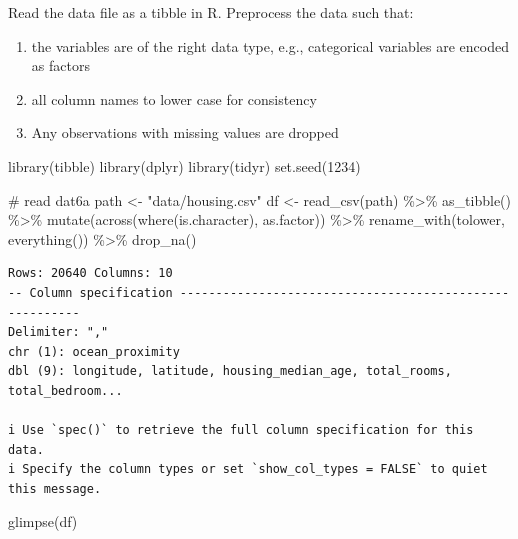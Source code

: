 \documentclass[
  letterpaper,
  DIV=11,
  numbers=noendperiod]{scrartcl}
\newenvironment{Shaded}{\begin{snugshade}}{\end{snugshade}}
\newcommand{\CommentTok}[1]{\textcolor[rgb]{0.37,0.37,0.37}{#1}}
\newcommand{\DecValTok}[1]{\textcolor[rgb]{0.68,0.00,0.00}{#1}}
\newcommand{\FunctionTok}[1]{\textcolor[rgb]{0.28,0.35,0.67}{#1}}
\newcommand{\NormalTok}[1]{\textcolor[rgb]{0.00,0.23,0.31}{#1}}
\newcommand{\OtherTok}[1]{\textcolor[rgb]{0.00,0.23,0.31}{#1}}
\newcommand{\SpecialCharTok}[1]{\textcolor[rgb]{0.37,0.37,0.37}{#1}}
\newcommand{\StringTok}[1]{\textcolor[rgb]{0.13,0.47,0.30}{#1}}
\providecommand{\tightlist}{%
  \setlength{\itemsep}{0pt}\setlength{\parskip}{0pt}}\usepackage{longtable,booktabs,array}
\begin{document}
Read the data file as a tibble in R. Preprocess the data such that:

\begin{enumerate}
\def\labelenumi{\arabic{enumi}.}
\tightlist
\item
  the variables are of the right data type, e.g., categorical variables
  are encoded as factors
\item
  all column names to lower case for consistency
\item
  Any observations with missing values are dropped
\end{enumerate}

\begin{Shaded}
\begin{Highlighting}[]
\FunctionTok{library}\NormalTok{(tibble)}
\FunctionTok{library}\NormalTok{(dplyr)}
\FunctionTok{library}\NormalTok{(tidyr)}
\FunctionTok{set.seed}\NormalTok{(}\DecValTok{1234}\NormalTok{)}

\CommentTok{\# read dat6a}
\NormalTok{path }\OtherTok{\textless{}{-}} \StringTok{"data/housing.csv"}
\NormalTok{df }\OtherTok{\textless{}{-}} \FunctionTok{read\_csv}\NormalTok{(path) }\SpecialCharTok{\%\textgreater{}\%} 
  \FunctionTok{as\_tibble}\NormalTok{() }\SpecialCharTok{\%\textgreater{}\%} 
  \FunctionTok{mutate}\NormalTok{(}\FunctionTok{across}\NormalTok{(}\FunctionTok{where}\NormalTok{(is.character), as.factor)) }\SpecialCharTok{\%\textgreater{}\%} 
  \FunctionTok{rename\_with}\NormalTok{(tolower, }\FunctionTok{everything}\NormalTok{()) }\SpecialCharTok{\%\textgreater{}\%} 
  \FunctionTok{drop\_na}\NormalTok{()}
\end{Highlighting}
\end{Shaded}

\begin{verbatim}
Rows: 20640 Columns: 10
-- Column specification --------------------------------------------------------
Delimiter: ","
chr (1): ocean_proximity
dbl (9): longitude, latitude, housing_median_age, total_rooms, total_bedroom...

i Use `spec()` to retrieve the full column specification for this data.
i Specify the column types or set `show_col_types = FALSE` to quiet this message.
\end{verbatim}

\begin{Shaded}
\begin{Highlighting}[]
\FunctionTok{glimpse}\NormalTok{(df)}
\end{Highlighting}
\end{Shaded}
\end{document}
